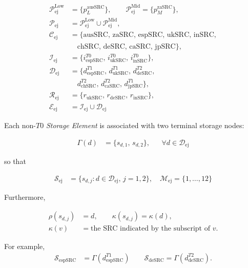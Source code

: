 \documentclass[a4paper,fleqn]{cas-dc}
\newcommand{\Pset}{\mathcal{P}}
\newcommand{\PL}{\mathcal{P}^{\mathrm{Low}}}
\newcommand{\PM}{\mathcal{P}^{\mathrm{Mid}}}
\newcommand{\Iset}{\mathcal{I}}
\newcommand{\Dset}{\mathcal{D}}
\newcommand{\Eset}{\mathcal{E}}
\newcommand{\Sset}{\mathcal{S}}
\newcommand{\Rset}{\mathcal{R}}
\newcommand{\Mset}{\mathcal{M}}
\newcommand{\Cset}{\mathcal{C}}
\begin{document}
\begin{align*}
\PL_{\mathrm{ej}} &= \{p_L^{\mathrm{ausSRC}}\}, \qquad
\PM_{\mathrm{ej}} = \{p_M^{\mathrm{zaSRC}}\}, \\[1ex]
\Pset_{\mathrm{ej}} &= \PL_{\mathrm{ej}} \cup \PM_{\mathrm{ej}}, \\[1.5ex]
\Cset_{\mathrm{ej}} &= \bigl\{\mathrm{ausSRC},\, \mathrm{zaSRC},\, \mathrm{espSRC},\, \mathrm{ukSRC},\, \mathrm{inSRC}, \\
&\quad \mathrm{chSRC},\, \mathrm{deSRC},\, \mathrm{caSRC},\, \mathrm{jpSRC}\bigr\}, \\[1.5ex]
\Iset_{\mathrm{ej}} &= \bigl\{i_{\mathrm{espSRC}}^{T0},\, i_{\mathrm{ukSRC}}^{T0},\, i_{\mathrm{inSRC}}^{T0}\bigr\}, \\[1.5ex]
\Dset_{\mathrm{ej}} &= \bigl\{d_{\mathrm{espSRC}}^{T1},\, d_{\mathrm{ukSRC}}^{T1},\, d_{\mathrm{deSRC}}^{T2}, \\
&\quad d_{\mathrm{chSRC}}^{T2},\, d_{\mathrm{caSRC}}^{T2},\, d_{\mathrm{jpSRC}}^{T1}\bigr\}, \\[1.5ex]
\Rset_{\mathrm{ej}} &= \{r_{\mathrm{ukSRC}},\, r_{\mathrm{deSRC}},\, r_{\mathrm{inSRC}}\}, \\[1ex]
\Eset_{\mathrm{ej}} &= \Iset_{\mathrm{ej}} \cup \Dset_{\mathrm{ej}}
\end{align*}


Each non-\(T0\) \emph{Storage Element} is associated with two terminal storage nodes:

\begin{align*}
\Gamma(d) &= \{s_{d,1},\, s_{d,2}\},
&& \forall d \in \Dset_{\mathrm{ej}}
\end{align*}

so that

\begin{align*}
\Sset_{\mathrm{ej}} &= \{s_{d,j}: d\in\Dset_{\mathrm{ej}},\, j=1,2\}, \quad
\Mset_{\mathrm{ej}} = \{1,\dots,12\}
\end{align*}

Furthermore,

\begin{align*}
\rho(s_{d,j}) &= d, \qquad \kappa(s_{d,j}) = \kappa(d), \\[1ex]
\kappa(v) &= \text{the SRC indicated by the subscript of } v.
\end{align*}

For example,
\begin{align*}
\Sset_{\mathrm{espSRC}} &= \Gamma(d_{\mathrm{espSRC}}^{T1}) \qquad
\Sset_{\mathrm{deSRC}} = \Gamma(d_{\mathrm{deSRC}}^{T2}).
\end{align*}
\end{document}
